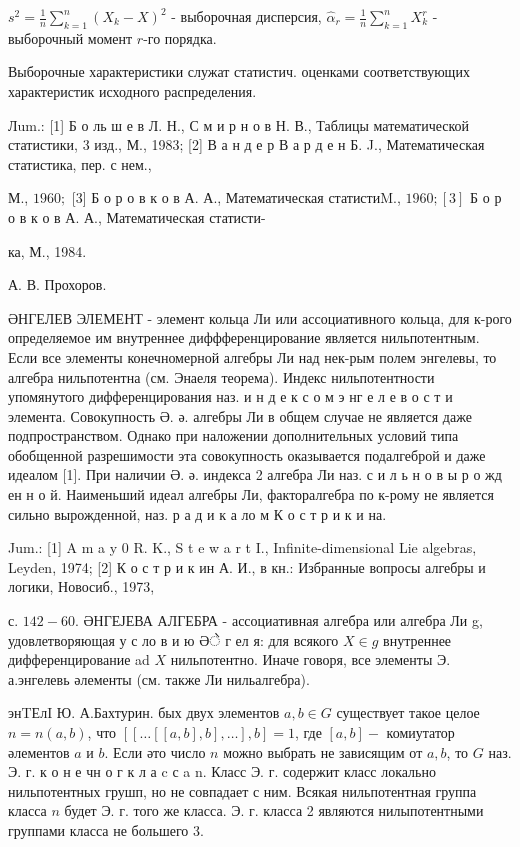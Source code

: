 \documentclass[10pt]{article}
\begin{document}
$s^{2}=\frac{1}{n} \sum_{k=1}^{n}\left(X_{k}-X\right)^{2}$ - выборочная дисперсия, $\hat{\alpha}_{r}=\frac{1}{n} \sum_{k=1}^{n} X_{k}^{r}$ - выборочный момент $r$-го порядка.



Выборочные характеристики служат статистич. оценками соответствующих характеристик исходного распределения.



Лum.: [1] Б о ль ш е в Л. Н., С м и р н о в Н. В., Таблицы математической статистики, 3 изд., М., 1983; [2] В а н д е р В а р д е н Б. J., Математическая статистика, пер. с нем.,

М., $1960 ;$ [3] Б о р о в к о в А. А., Математическая статистиM., $1960 ;[3]$ Б о р о в к о в А. А., Математическая статисти-

ка, М., 1984.

А. В. Прохоров.



ӘНГЕЛЕВ ЭЛЕМЕНТ - элемент кольца Ли или ассоциативного кольца, для к-рого определяемое им внутреннее диффференцирование является нильпотентным. Если все элементы конечномерной алгебры Ли над нек-рым полем энгелевы, то алгебра нильпотентна (см. Энаеля теорема). Индекс нильпотентности упомянутого дифференцирования наз. и н д е к с о м э нг е л е в о с т и элемента. Совокупность Ә. ә. алгебры Ли в общем случае не является даже подпространством. Однако при наложении дополнительных условий типа обобщенной разрешимости эта совокупность оказывается подалгеброй и даже идеалом [1]. При наличии Ә. ә. индекса 2 алгебра Ли наз. с и л ь н о в ы р о жд ен н о й. Наименьший идеал алгебры Ли, факторалгебра по к-рому не является сильно вырожденной, наз. р а д и к а ло м К о с т р и к и на.



Jum.: [1] A m a y 0 R. K., S t e w a r t I., Infinite-dimensional Lie algebras, Leyden, 1974; [2] К о с т р и к ин А. И., в кн.: Избранные вопросы алгебры и логики, Новосиб., 1973,

с. $142-60$. ӘНГЕЈЕВА АЛГЕБРА - ассоциативная алгебра или алгебра Ли g, удовлетворяющая у с ло в и ю Әे г ел я: для всякого $X \in g$ внутреннее дифференцирование ad $X$ нильпотентно. Иначе говоря, все элементы Э. а.энгелевь әлементы (см. также Ли нильалгебра).



энTЕлI Ю. А.Бахтурин. бых двух элементов $a, b \in G$ существует такое целое $n=n(a, b)$, что $[[\ldots[[a, b], b], \ldots], b]=1$, где $[a, b]-$ комиутатор әлементов $a$ и $b$. Если әто число $n$ можно выбрать не зависящим от $a, b$, то $G$ наз. Э. г. к о н е чн о г к л а c с a n. Класс Э. г. содержит класс локально нильпотентных грушп, но не совпадает с ним. Всякая нильпотентная группа класса $n$ будет Э. г. того же класса. Э. г. класса 2 являются нилыпотентными группами класса не большего 3.
\end{document}
